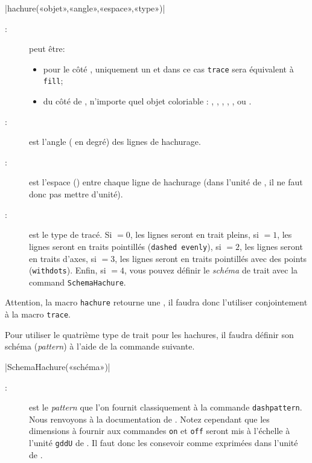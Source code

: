 \documentclass[a4paper,french]{article}
\begin{document}
\begin{colourband}
\macro|hachure(«objet»,«angle»,«espace»,«type»)|
\begin{description}
  \item[:] peut être:
  \begin{itemize}
    \item pour le côté \MP, uniquement un  et dans ce cas \lstinline+trace+ sera équivalent à \lstinline+fill+;
    \item du côté de \mpgeomdd,
  n'importe quel objet \og{}coloriable\fg{} : ,
   , , , , ou
  .
  \end{itemize}
  \item[:] est l’angle ( en degré) des lignes de
  hachurage. 
  \item[:] est l’espace () entre chaque ligne de
  hachurage (dans l’unité de \mpgeomdd, il ne faut donc pas mettre d’unité).
  \item[:] est le type de tracé. Si $=0$, les lignes
  seront en trait pleins, si $=1$, les lignes seront en traits
  pointillés (\lstinline+dashed evenly+), si $=2$, les lignes
  seront en traits d’axes, si $=3$, les lignes
  seront en traits pointillés avec des points (\lstinline+withdots+). Enfin, si
  $=4$, vous pouvez définir le \emph{schéma} de trait avec la command \lstinline+SchemaHachure+. 
\end{description}
\end{colourband}

Attention, la macro \lstinline+hachure+ retourne une , il faudra
donc l’utiliser conjointement à la macro \lstinline+trace+. 

Pour utiliser le quatrième type de trait pour les hachures, il faudra définir
son schéma (\emph{pattern}) à l’aide de la commande suivante. 

\begin{colourband}
\macro|SchemaHachure(«schéma»)|
\begin{description}
  \item[:] est le \emph{pattern} que l’on fournit classiquement à
  la commande \lstinline+dashpattern+. Nous renvoyons à la documentation de
  \MP{}. Notez cependant que les dimensions à fournir aux commandes
  \lstinline+on+ et \lstinline+off+ seront mis à l’échelle à l’unité
  \lstinline+gddU+ de \mpgeomdd. Il faut donc les consevoir comme exprimées dans
  l’unité de \mpgeomdd.  
\end{description}
\end{colourband}
\end{document}
